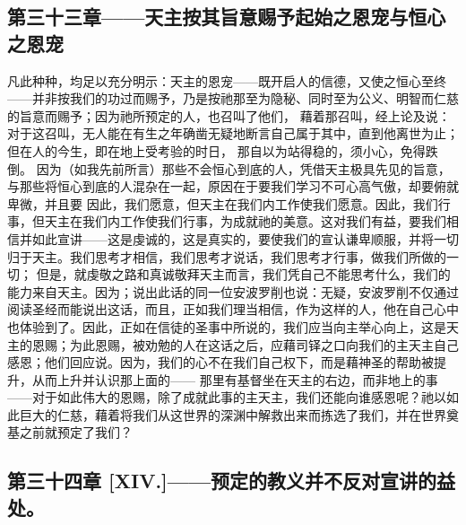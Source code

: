 
\subsection{第三十三章——天主按其旨意赐予起始之恩宠与恒心之恩宠}

凡此种种，均足以充分明示：天主的恩宠——既开启人的信德，又使之恒心至终——并非按我们的功过而赐予，乃是按祂那至为隐秘、同时至为公义、明智而仁慈的旨意而赐予；因为祂所预定的人，也召叫了他们， 藉着那召叫，经上论及说： 对于这召叫，无人能在有生之年确凿无疑地断言自己属于其中，直到他离世为止；但在人的今生，即在地上受考验的时日， 那自以为站得稳的，须小心，免得跌倒。 因为（如我先前所言）那些不会恒心到底的人，凭借天主极具先见的旨意，与那些将恒心到底的人混杂在一起，原因在于要我们学习不可心高气傲，却要俯就卑微，并且要 因此，我们愿意，但天主在我们内工作使我们愿意。因此，我们行事，但天主在我们内工作使我们行事，为成就祂的美意。这对我们有益，要我们相信并如此宣讲——这是虔诚的，这是真实的，要使我们的宣认谦卑顺服，并将一切归于天主。我们思考才相信，我们思考才说话，我们思考才行事，做我们所做的一切； 但是，就虔敬之路和真诚敬拜天主而言，我们凭自己不能思考什么，我们的能力来自天主。因为；说出此话的同一位安波罗削也说：无疑，安波罗削不仅通过阅读圣经而能说出这话，而且，正如我们理当相信，作为这样的人，他在自己心中也体验到了。因此，正如在信徒的圣事中所说的，我们应当向主举心向上，这是天主的恩赐；为此恩赐，被劝勉的人在这话之后，应藉司铎之口向我们的主天主自己感恩；他们回应说。因为，我们的心不在我们自己权下，而是藉神圣的帮助被提升，从而上升并认识那上面的—— 那里有基督坐在天主的右边，而非地上的事——对于如此伟大的恩赐，除了成就此事的主天主，我们还能向谁感恩呢？祂以如此巨大的仁慈，藉着将我们从这世界的深渊中解救出来而拣选了我们，并在世界奠基之前就预定了我们？\par


\subsection{第三十四章 [XIV.]——预定的教义并不反对宣讲的益处。}

